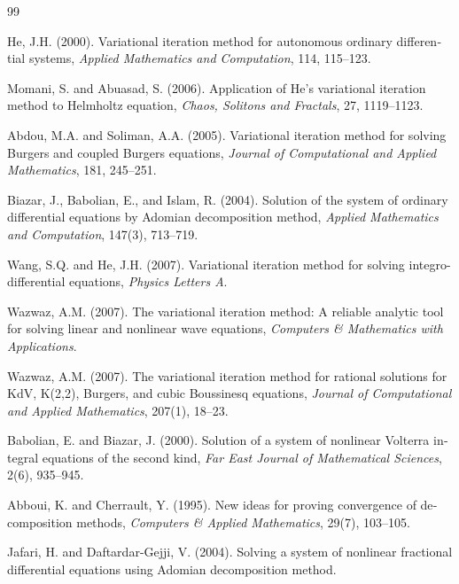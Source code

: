 	\renewcommand{\thepage}{\en{\arabic{page}}}
\begin{thebibliography}{99}
\begin{otherlanguage}{english}
	He, J.H. (2000).
	Variational iteration method for autonomous ordinary differential systems,
	\textit{Applied Mathematics and Computation}, 114, 115--123.
	
	Momani, S. and Abuasad, S. (2006).
	Application of He’s variational iteration method to Helmholtz equation,
	\textit{Chaos, Solitons and Fractals}, 27, 1119--1123.
	
	Abdou, M.A. and Soliman, A.A. (2005).
	Variational iteration method for solving Burgers and coupled Burgers equations,
	\textit{Journal of Computational and Applied Mathematics}, 181, 245--251.
	
	Biazar, J., Babolian, E., and Islam, R. (2004).
	Solution of the system of ordinary differential equations by Adomian decomposition method,
	\textit{Applied Mathematics and Computation}, 147(3), 713--719.
	
	Wang, S.Q. and He, J.H. (2007).
	Variational iteration method for solving integro-differential equations,
	\textit{Physics Letters A}.
	
	Wazwaz, A.M. (2007).
	The variational iteration method: A reliable analytic tool for solving linear and nonlinear wave equations,
	\textit{Computers \& Mathematics with Applications}.
	
	Wazwaz, A.M. (2007).
	The variational iteration method for rational solutions for KdV, K(2,2), Burgers, and cubic Boussinesq equations,
	\textit{Journal of Computational and Applied Mathematics}, 207(1), 18--23.
	
	Babolian, E. and Biazar, J. (2000).
	Solution of a system of nonlinear Volterra integral equations of the second kind,
	\textit{Far East Journal of Mathematical Sciences}, 2(6), 935--945.
	
	Abboui, K. and Cherrault, Y. (1995).
	New ideas for proving convergence of decomposition methods,
	\textit{Computers \& Applied Mathematics}, 29(7), 103--105.
	
	Jafari, H. and Daftardar-Gejji, V. (2004).
	Solving a system of nonlinear fractional differential equations using Adomian decomposition method.
	

\end{otherlanguage}
\end{thebibliography}
